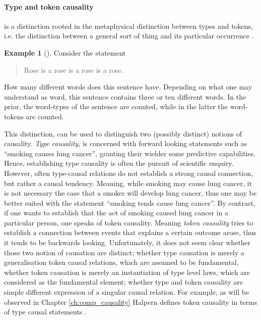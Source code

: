 \documentclass[11pt,a4paper]{book}
\theoremstyle{definition}
\theoremstyle{definition}
\newtheorem{example}{Example}[section]
\theoremstyle{definition}
\theoremstyle{remark}
\begin{document}
\paragraph{Type and token causality} is a distinction rooted in the metaphysical distinction between types and tokens, i.e. the distinction between a general sort of thing and its particular occurrence \cite{wetzel2018typetoken}.

\begin{example}[\cite{hausman2005causal}]
Consider the statement 
\begin{quote}
Rose is a rose is a rose is a rose.
\end{quote}
How many different words does this sentence have.  Depending on what one may understand as word, this sentence contains three or ten different words. In the prior, the word-types of the sentence are counted, while in the latter the word-tokens are counted. 
\end{example}

This distinction, can be used to distinguish two (possibly distinct) notions of  causality. \emph{Type causality}, is concerned with forward looking statements such as ``smoking causes lung cancer'', granting their wielder some predictive capabilities. Hence, establishing type causality is often the pursuit of scientific enquiry. However, often type-causal relations do not establish a strong causal connection, but rather a causal tendency. Meaning, while smoking may cause lung cancer, it is not necessary the case that a smoker will develop lung cancer, thus one may be better suited with the statement ``smoking tends cause lung cancer''. By contrast, if one wants to establish that the act of smoking caused lung cancer in a particular person, one speaks of token causality. Meaning \emph{token causality} tries to establish a connection between events that explains a certain outcome arose, thus it tends to be backwards looking.
Unfortunately, it does not seem clear whether those two notion of causation are distinct; whether type causation is merely a generalisation token causal relations, which are assumed to be fundamental, whether token causation is merely an instantiation of type level laws, which are considered as the fundamental element; whether type and token causality are simple different expression of a singular causal relation. 
For example, as will be observed in Chapter \ref{ch:comp_causality}  Halpern defines token causality in terms of type causal statements \cite{hausman2005causal,halpern2016actual}. 
\end{document}
